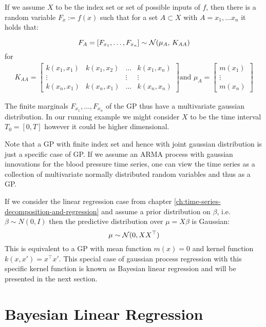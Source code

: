 If we assume $X$ to be the index set or set of possible inputs of $f$, then there is a random variable
$F_x := f(x)$ such that for a set $A \subset X$ with $A={x_1, \dots x_n}$ it holds that:

\[F_A = [F_{x_1}, \dots , F_{x_n}] \sim \operatorname{\mathcal{N}}(\mu_A,\,K_{AA})\]
for
\begin{gather}\label{def:Kernel-Matrix}
    K_{AA} =
    \begin{bmatrix}
        k(x_1, x_1) & k(x_1, x_2) & \dots & k(x_1, x_n)\\
        \vdots  &  & \vdots  & \vdots \\
        k(x_n, x_1)  & k(x_n, x_1) & \dots  & k(x_n, x_n)
    \end{bmatrix} \text{and }
    \mu_A =
    \begin{bmatrix}
        m(x_1) \\
        \vdots \\
        m(x_n)
    \end{bmatrix}
\end{gather}

The finite marginals $F_{x_1}, \dots, F_{x_n}$ of the GP thus have a multivariate gaussian distribution.
In our running example we might consider $X$ to be the time interval $T_0=[0, T]$ however it could be higher dimensional.

Note that a GP with finite index set and hence with joint gaussian distribution is just a specific case
of GP. If we assume an ARMA process with gaussian innovations for the blood pressure time series, one can view the time series
as a collection of multivariate normally distributed random variables and thus as a GP.


If we consider the linear regression case from chapter \ref{ch:time-series-decomposition-and-regression} and assume a
prior distribution
on $\beta$, i.e. $\beta \sim N(0, I)$ then the predictive distribution over $\mu = X \beta$ is Gaussian:
\[
    \mu \sim \operatorname{\mathcal{N}}(0, XX^{\top})
\]
This is equivalent to a GP with mean function $m(x) = 0$ and kernel function $k(x, x') = x^{\top}x'$.
This special case of gaussian process regression with this specific kernel function is known as Bayesian linear regression
and will be presented in the next section.


\section{Bayesian Linear Regression}\label{subsec:bayesian-linear-regression}

